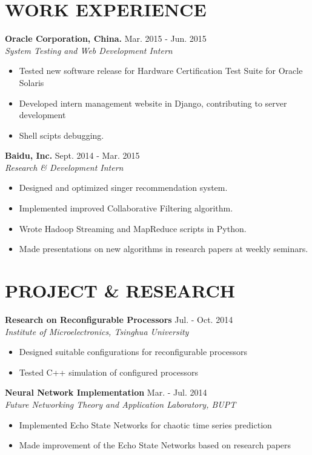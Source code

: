 \documentclass[margin,10pt]{res} %
\begin{document}
\begin{resume}
\section{WORK EXPERIENCE}
\leftmargini=4mm
{\bf Oracle Corporation, China.} \hfill Mar. 2015 - Jun. 2015 \\
\textit{System Testing and Web Development Intern}
\begin{itemize}
\item Tested new software release for Hardware Certification Test Suite for Oracle Solaris
\item Developed intern management website in Django, contributing to server development
\item Shell scipts debugging.
\end{itemize}

{\bf Baidu, Inc.} \hfill Sept. 2014 - Mar. 2015 \\
\textit{Research \& Development Intern}
\begin{itemize}  %
\item Designed and optimized singer recommendation system.
\item Implemented improved Collaborative Filtering algorithm.
\item Wrote Hadoop Streaming and MapReduce scripts in Python. 
\item Made presentations on new algorithms in research papers at weekly seminars.
\end{itemize}

\section{PROJECT \& RESEARCH}
{\bf Research on Reconfigurable Processors} \hfill Jul. - Oct. 2014 \\ 
\textit{Institute of Microelectronics, Tsinghua University}
\begin{itemize}  %
\item Designed suitable configurations for reconfigurable processors
\item Tested C++ simulation of configured processors
\end{itemize}

{\bf Neural Network Implementation} \hfill Mar. - Jul. 2014 \\
\textit{Future Networking Theory and Application Laboratory, BUPT}
\begin{itemize}  %
\item Implemented Echo State Networks for chaotic time series prediction
\item Made improvement of the Echo State Networks based on research papers
\end{itemize}


\end{resume}
\end{document}
